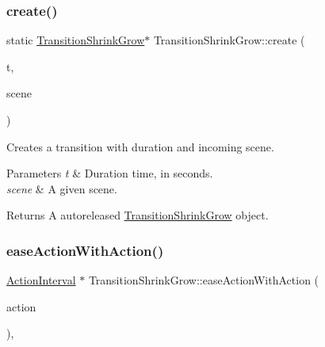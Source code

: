 \subsubsection{\texorpdfstring{create()}{create()}\hspace{0.1cm}{\footnotesize\ttfamily [2/2]}}
{\footnotesize\ttfamily static \hyperlink{classTransitionShrinkGrow}{Transition\+Shrink\+Grow}$\ast$ Transition\+Shrink\+Grow\+::create (\begin{DoxyParamCaption}\item[{float}]{t,  }\item[{\hyperlink{classScene}{Scene} $\ast$}]{scene }\end{DoxyParamCaption})\hspace{0.3cm}{\ttfamily [static]}}

Creates a transition with duration and incoming scene.


\begin{DoxyParams}{Parameters}
{\em t} & Duration time, in seconds. \\
\hline
{\em scene} & A given scene. \\
\hline
\end{DoxyParams}
\begin{DoxyReturn}{Returns}
A autoreleased \hyperlink{classTransitionShrinkGrow}{Transition\+Shrink\+Grow} object. 
\end{DoxyReturn}
\mbox{\label{classTransitionShrinkGrow_a82ee7adb79f7d88a67a281736f2c19ba}} 
\subsubsection{\texorpdfstring{ease\+Action\+With\+Action()}{easeActionWithAction()}\hspace{0.1cm}{\footnotesize\ttfamily [1/2]}}
{\footnotesize\ttfamily \hyperlink{classActionInterval}{Action\+Interval} $\ast$ Transition\+Shrink\+Grow\+::ease\+Action\+With\+Action (\begin{DoxyParamCaption}\item[{\hyperlink{classActionInterval}{Action\+Interval} $\ast$}]{action }\end{DoxyParamCaption})\hspace{0.3cm}{\ttfamily [override]}, {\ttfamily [virtual]}}


